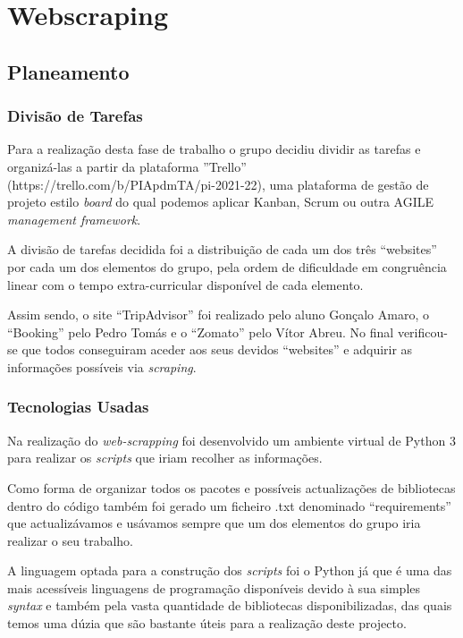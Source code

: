 \chapter{Webscraping}
\label{cap3}

\section{Planeamento}
\subsection{Divisão de Tarefas}
Para a realização desta fase de trabalho o grupo decidiu dividir as tarefas e organizá-las a partir da plataforma ''Trello'' (https://trello.com/b/PIApdmTA/pi-2021-22), uma plataforma de gestão de projeto estilo \textit{board} do qual podemos aplicar Kanban, Scrum ou outra AGILE \textit{management framework}.

A divisão de tarefas decidida foi a distribuição de cada um dos três ``websites'' por cada um dos elementos do grupo, pela ordem de dificuldade em congruência linear com o tempo extra-curricular disponível de cada elemento.

Assim sendo, o site ``TripAdvisor'' foi realizado pelo aluno Gonçalo Amaro, o ``Booking'' pelo Pedro Tomás e o ``Zomato'' pelo Vítor Abreu. No final verificou-se que todos conseguiram aceder aos seus devidos ``websites'' e adquirir as informações possíveis via \textit{scraping}.

\subsection{Tecnologias Usadas}
Na realização do \textit{web-scrapping} foi desenvolvido um ambiente virtual de Python 3 para realizar os \textit{scripts} que iriam recolher as informações.

Como forma de organizar todos os pacotes e possíveis actualizações de bibliotecas dentro do código também foi gerado um ficheiro .txt denominado ``requirements'' que actualizávamos e usávamos sempre que um dos elementos do grupo iria realizar o seu trabalho.

A linguagem optada para a construção dos \textit{scripts} foi o Python já que é uma das mais acessíveis linguagens de programação disponíveis devido à sua simples \textit{syntax} e também pela vasta quantidade de bibliotecas disponibilizadas, das quais temos uma dúzia que são bastante úteis para a realização deste projecto.

